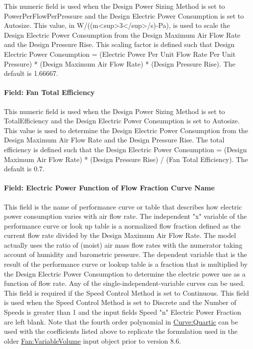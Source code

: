 This numeric field is used when the Design Power Sizing Method is set to PowerPerFlowPerPressure and the Design Electric Power Consumption is set to Autosize. This value, in W/((m<sup>3</sup>/s)-Pa), is used to scale the Design Electric Power Consumption from the Design Maximum Air Flow Rate and the Design Pressure Rise. This scaling factor is defined such that Design Electric Power Consumption = (Electric Power Per Unit Flow Rate Per Unit Pressure) * (Design Maximum Air Flow Rate) * (Design Pressure Rise).  The default is 1.66667.

\paragraph{Field: Fan Total Efficiency}\label{field-total-efficiency-fansysmodel}

This numeric field is used when the Design Power Sizing Method is set to TotalEfficiency and the Design Electric Power Consumption is set to Autosize. This value is used to determine the Design Electric Power Consumption from the Design Maximum Air Flow Rate and the Design Pressure Rise.  The total efficiency is defined such that the Design Electric Power Consumption = (Design Maximum Air Flow Rate) * (Design Pressure Rise) / (Fan Total Efficiency).  The default is 0.7.

\paragraph{Field: Electric Power Function of Flow Fraction Curve Name}\label{field-power-curve-name-fansysmodel}

This field is the name of performance curve or table that describes how electric power consumption varies with air flow rate.  The independent "x" variable of the performance curve or look up table is a normalized flow fraction defined as the current flow rate divided by the Design Maximum Air Flow Rate.  The model actually uses the ratio of (moist) air mass flow rates with the numerator taking account of humidity and barometric pressure.  The dependent variable that is the result of the performance curve or lookup table is a fraction that is multiplied by the Design Electric Power Consumption to determine the electric power use as a function of flow rate.  Any of the single-independent-variable curves can be used. This field is required if the Speed Control Method is set to Continuous. This field is used when the Speed Control Method is set to Discrete and the Number of Speeds is greater than 1 and the input fields Speed "n" Electric Power Fraction are left blank.  Note that the fourth order polynomial in \hyperref[curvequartic]{Curve:Quartic} can be used with the coefficients listed above to replicate the formulation used in the older \hyperref[fanvariablevolume]{Fan:VariableVolume} input object prior to version 8.6.

